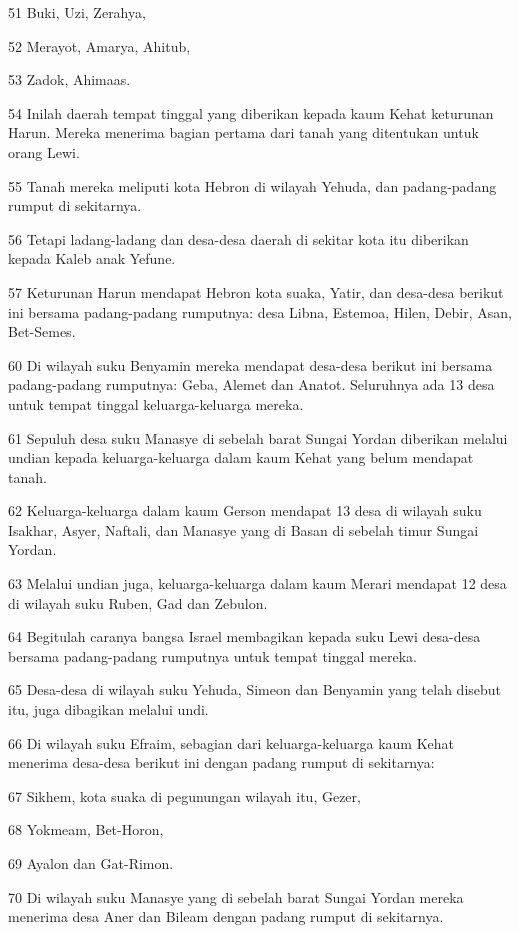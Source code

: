 \par 51 Buki, Uzi, Zerahya,
\par 52 Merayot, Amarya, Ahitub,
\par 53 Zadok, Ahimaas.
\par 54 Inilah daerah tempat tinggal yang diberikan kepada kaum Kehat keturunan Harun. Mereka menerima bagian pertama dari tanah yang ditentukan untuk orang Lewi.
\par 55 Tanah mereka meliputi kota Hebron di wilayah Yehuda, dan padang-padang rumput di sekitarnya.
\par 56 Tetapi ladang-ladang dan desa-desa daerah di sekitar kota itu diberikan kepada Kaleb anak Yefune.
\par 57 Keturunan Harun mendapat Hebron kota suaka, Yatir, dan desa-desa berikut ini bersama padang-padang rumputnya: desa Libna, Estemoa, Hilen, Debir, Asan, Bet-Semes.
\par 60 Di wilayah suku Benyamin mereka mendapat desa-desa berikut ini bersama padang-padang rumputnya: Geba, Alemet dan Anatot. Seluruhnya ada 13 desa untuk tempat tinggal keluarga-keluarga mereka.
\par 61 Sepuluh desa suku Manasye di sebelah barat Sungai Yordan diberikan melalui undian kepada keluarga-keluarga dalam kaum Kehat yang belum mendapat tanah.
\par 62 Keluarga-keluarga dalam kaum Gerson mendapat 13 desa di wilayah suku Isakhar, Asyer, Naftali, dan Manasye yang di Basan di sebelah timur Sungai Yordan.
\par 63 Melalui undian juga, keluarga-keluarga dalam kaum Merari mendapat 12 desa di wilayah suku Ruben, Gad dan Zebulon.
\par 64 Begitulah caranya bangsa Israel membagikan kepada suku Lewi desa-desa bersama padang-padang rumputnya untuk tempat tinggal mereka.
\par 65 Desa-desa di wilayah suku Yehuda, Simeon dan Benyamin yang telah disebut itu, juga dibagikan melalui undi.
\par 66 Di wilayah suku Efraim, sebagian dari keluarga-keluarga kaum Kehat menerima desa-desa berikut ini dengan padang rumput di sekitarnya:
\par 67 Sikhem, kota suaka di pegunungan wilayah itu, Gezer,
\par 68 Yokmeam, Bet-Horon,
\par 69 Ayalon dan Gat-Rimon.
\par 70 Di wilayah suku Manasye yang di sebelah barat Sungai Yordan mereka menerima desa Aner dan Bileam dengan padang rumput di sekitarnya.
